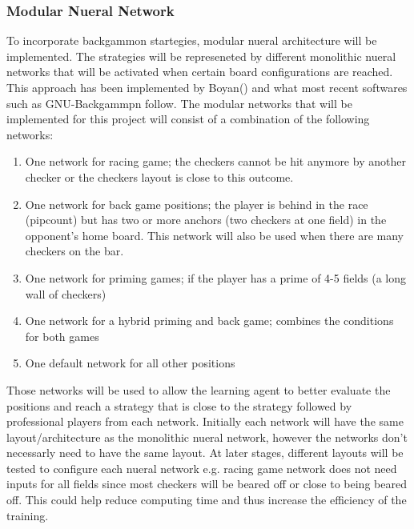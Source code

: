 \documentclass[12pt,a4paper]{article}
\begin{document}
\subsubsection{Modular Nueral Network}
To incorporate backgammon startegies, modular nueral architecture will be implemented. The strategies will be represeneted by different monolithic nueral networks that will be activated when certain board configurations are reached. This approach has been implemented by Boyan() and what most recent softwares such as GNU-Backgammpn follow. The modular networks that will be implemented for this project will consist of a combination of the following networks:
\begin{enumerate}
    \item One network for racing game; the checkers cannot be hit anymore by another checker or the checkers layout is close to this outcome.
    \item One network for back game positions; the player is behind in the race (pipcount) but has two or more anchors (two checkers at one field) in the opponent's home board. This network will also be used when there are many checkers on the bar.
    \item One network for priming games; if the player has a prime of 4-5 fields (a long wall of checkers) 
    \item One network for a hybrid priming and back game; combines the conditions for both games
    \item One default network for all other positions
\end{enumerate}
Those networks will be used to allow the learning agent to better evaluate the positions and reach a strategy that is close to the strategy followed by professional players from each network. Initially each network will have the same layout/architecture as the monolithic nueral network, however the networks don't necessarly need to have the same layout. At later stages, different layouts will be tested to configure each nueral network e.g. racing game network does not need inputs for all fields since most checkers will be beared off or close to being beared off. This could help reduce computing time and thus increase the efficiency of the training.
\end{document}
